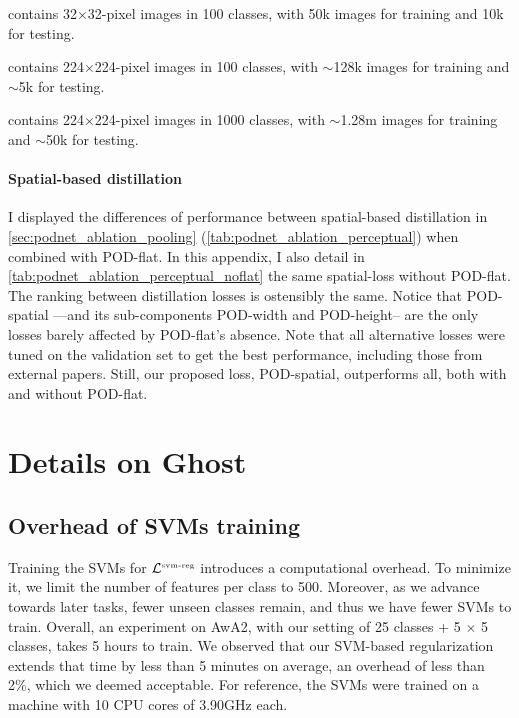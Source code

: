{\begin{description} \setlength{\parskip}{0pt}
      \item[CIFAR100] contains 32$\times$32-pixel images in 100 classes, with 50k images for
            training and 10k for testing.
      \item[ImageNet100] contains 224$\times$224-pixel images in 100 classes, with $\sim$128k images
            for training and $\sim$5k for testing.
      \item[ImageNet1000] contains 224$\times$224-pixel images in 1000 classes, with $\sim$1.28m
            images for training and $\sim$50k for testing. \end{description}}

\paragraph{Spatial-based distillation} I displayed the differences of performance between
spatial-based distillation in \autoref{sec:podnet_ablation_pooling}
(\autoref{tab:podnet_ablation_perceptual}) when combined with POD-flat. In this appendix, I also
detail in \autoref{tab:podnet_ablation_perceptual_noflat} the same spatial-loss without POD-flat.
The ranking between distillation losses is ostensibly the same. Notice that POD-spatial ---and its
sub-components POD-width and POD-height-- are the only losses barely affected by POD-flat's absence.
Note that all alternative losses were tuned on the validation set to get the best performance,
including those from external papers. Still, our proposed loss, POD-spatial, outperforms all, both
with and without POD-flat.





\section{Details on Ghost}
\label{sec:appendix_ghost}


\subsection{Overhead of SVMs training}

Training the SVMs for $\mathcal{L}^{\text{\tiny{svm-reg}}}$ introduces a computational overhead. To
minimize it, we limit the number of features per class to 500. Moreover, as we advance towards later
tasks, fewer unseen classes remain, and thus we have fewer SVMs to train. Overall, an experiment on
AwA2, with our setting of 25 classes + 5 $\times$ 5 classes, takes 5 hours to train. We observed
that our SVM-based regularization extends that time by less than 5 minutes on average, an overhead
of less than 2\%, which we deemed acceptable. For reference, the SVMs were trained on a machine with
10 CPU cores of 3.90GHz each.

